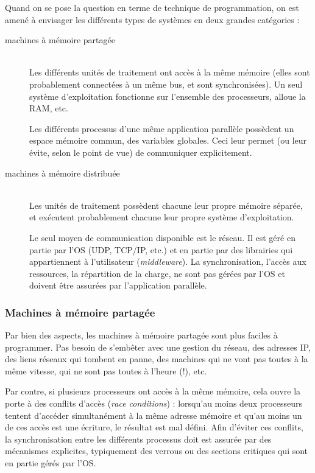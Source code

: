 Quand on se pose la question en terme de \og technique de programmation\fg, on
est amené à envisager les différents types de systèmes en deux grandes
catégories :
\begin{description}
\item[machines à mémoire partagée] \hfill\\
  Les différents unités de traitement ont accès à la même mémoire (elles sont
  probablement connectées à un même bus, et sont synchronisées). Un seul système
  d'exploitation fonctionne sur l'ensemble des processeurs, alloue la RAM, etc.

  Les différents processus d'une même application parallèle possèdent un espace
  mémoire commun, des variables globales. Ceci leur permet (ou leur évite, selon
  le point de vue) de communiquer explicitement.

\item[machines à mémoire distribuée] \hfill\\
  Les unités de traitement possèdent chacune leur propre mémoire séparée, et
  exécutent probablement chacune leur propre système d'exploitation.

  Le seul moyen de communication disponible est le réseau. Il est géré en partie
  par l'OS (UDP, TCP/IP, etc.) et en partie par des librairies qui appartiennent à
  l'utilisateur (\textit{middleware}). La synchronisation, l'accès aux
  ressources, la répartition de la charge, ne sont pas gérées par l'OS et
  doivent être assurées par l'application parallèle.
\end{description}

\subsubsection{Machines à mémoire partagée}

Par bien des aspects, les machines à mémoire partagée sont plus faciles à
programmer. Pas besoin de s'embêter avec une gestion du réseau, des adresses IP,
des liens réseaux qui tombent en panne, des machines qui ne vont pas toutes à la
même vitesse, qui ne sont pas toutes à l'heure (!), etc.

Par contre, si plusieurs processeurs ont accès à la même mémoire, cela ouvre la
porte à des conflits d'accès (\textit{race conditions}) : lorsqu'au moins deux
processeurs tentent d'accéder simultanément à la même adresse mémoire et qu'au
moins un de ces accès est une écriture, le résultat est mal défini.  Afin
d'éviter ces conflits, la synchronisation entre les différents processus doit
est assurée par des mécanismes explicites, typiquement des verrous ou des
sections critiques qui sont en partie gérés par l'OS.

